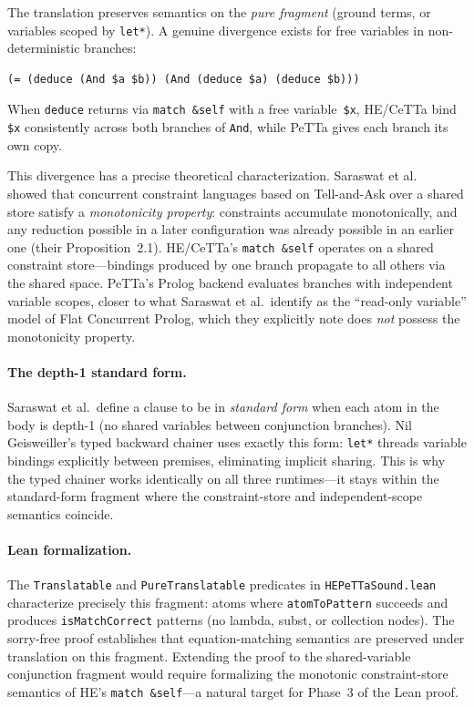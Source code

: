 \documentclass[11pt]{article}
\newcommand{\code}[1]{\texttt{#1}}
\newcommand{\PeTTa}{\textup{PeTTa}}
\newcommand{\HE}{\textup{HE}}
\newcommand{\CeTTa}{\textup{CeTTa}}
\begin{document}
The translation preserves semantics on the \emph{pure fragment}
(ground terms, or variables scoped by \code{let*}).  A genuine
divergence exists for free variables in non-deterministic branches:
\begin{lstlisting}[language={},basicstyle=\ttfamily\scriptsize]
(= (deduce (And $a $b)) (And (deduce $a) (deduce $b)))
\end{lstlisting}
When \code{deduce} returns via \code{match \&self} with a free
variable~\code{\$x}, \HE{}/\CeTTa{} bind \code{\$x} consistently
across both branches of \code{And}, while \PeTTa{} gives each branch
its own copy.

This divergence has a precise theoretical characterization.
Saraswat et al.~\cite{saraswat1988} showed that concurrent constraint
languages based on Tell-and-Ask over a shared store satisfy a
\emph{monotonicity property}: constraints accumulate monotonically,
and any reduction possible in a later configuration was already
possible in an earlier one (their Proposition~2.1).  \HE{}/\CeTTa{}'s
\code{match~\&self} operates on a shared constraint store---bindings
produced by one branch propagate to all others via the shared space.
\PeTTa{}'s Prolog backend evaluates branches with independent variable
scopes, closer to what Saraswat et al.\ identify as the
``read-only variable'' model of Flat Concurrent Prolog, which they
explicitly note does \emph{not} possess the monotonicity property.

\paragraph{The depth-1 standard form.}
Saraswat et al.\ define a clause to be in \emph{standard form} when
each atom in the body is depth-1 (no shared variables between
conjunction branches).  Nil Geisweiller's typed backward chainer
uses exactly this form: \code{let*} threads variable bindings
explicitly between premises, eliminating implicit sharing.  This is
why the typed chainer works identically on all three runtimes---it
stays within the standard-form fragment where the constraint-store
and independent-scope semantics coincide.

\paragraph{Lean formalization.}
The \code{Translatable} and \code{PureTranslatable} predicates in
\code{HEPeTTaSound.lean} characterize precisely this fragment: atoms
where \code{atomToPattern} succeeds and produces
\code{isMatchCorrect} patterns (no lambda, subst, or collection
nodes).  The sorry-free proof establishes that equation-matching
semantics are preserved under translation on this fragment.  Extending
the proof to the shared-variable conjunction fragment would require
formalizing the monotonic constraint-store semantics of \HE{}'s
\code{match~\&self}---a natural target for Phase~3 of the Lean proof.
\end{document}
